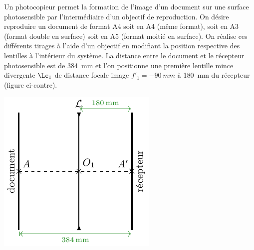 \documentclass[../../main/main.tex]{subfiles}
\begin{document}
\begin{minipage}{0.55\linewidth}
	Un photocopieur permet la formation de l'image d'un document sur une surface
	photosensible par l'intermédiaire d'un objectif de reproduction. On désire
	reproduire un document de format A4 soit en A4 (même format), soit en A3 (format
	double en surface) soit en A5 (format moitié en surface). On réalise ces
	différents tirages à l'aide d'un objectif en modifiant la position respective
	des lentilles à l'intérieur du système. La distance entre le document et le
	récepteur photosensible est de \SI{384}{mm} et l'on positionne une première lentille
	mince divergente $\Lc_1$ de distance focale image $f'_1 = \SI{-90}{mm}$ à
	\SI{180}{mm} du récepteur (figure ci-contre).
\end{minipage}
\begin{minipage}{0.45\linewidth}
	\begin{center}
		\includegraphics[width=.8\linewidth]{photocopieur-a}
	\end{center}
\end{minipage}
\end{document}
